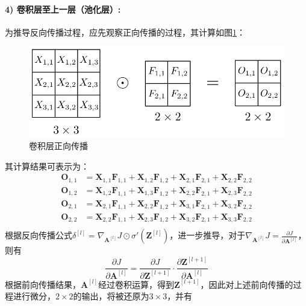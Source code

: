 \paragraph{4) 卷积层至上一层（池化层）:}
为推导反向传播过程，应先观察正向传播的过程，其计算如图\ref{fig:conv-fp}：
\begin{figure}[htbp]
  \centering
  \includegraphics[width=.8\textwidth]{figures/convolutional-fp.pdf}
  \caption{卷积层正向传播}
  \label{fig:conv-fp}
\end{figure}
其计算结果可表示为：
$$
\begin{aligned}
  \mathbf{O}_{1,1} &= \mathbf{X}_{1,1}\mathbf{F}_{1,1} + \mathbf{X}_{1,2}\mathbf{F}_{1,2} + \mathbf{X}_{2,1}\mathbf{F}_{2,1} + \mathbf{X}_{2,2}\mathbf{F}_{2,2} \\
  \mathbf{O}_{1,2} &= \mathbf{X}_{1,2}\mathbf{F}_{1,1} + \mathbf{X}_{1,3}\mathbf{F}_{1,2} + \mathbf{X}_{2,2}\mathbf{F}_{2,1} + \mathbf{X}_{2,3}\mathbf{F}_{2,2} \\
  \mathbf{O}_{2,1} &= \mathbf{X}_{2,1}\mathbf{F}_{1,1} + \mathbf{X}_{2,2}\mathbf{F}_{1,2} + \mathbf{X}_{3,1}\mathbf{F}_{2,1} + \mathbf{X}_{3,2}\mathbf{F}_{2,2} \\
  \mathbf{O}_{2,2} &= \mathbf{X}_{2,2}\mathbf{F}_{1,1} + \mathbf{X}_{2,3}\mathbf{F}_{1,2} + \mathbf{X}_{3,2}\mathbf{F}_{2,1} + \mathbf{X}_{3,3}\mathbf{F}_{2,2} \\
\end{aligned}
$$
根据反向传播公式$\delta ^{[l]} = \nabla _{\mathbf{A}^{[l]}} J \odot \sigma' \left(\mathbf{Z}^{[l]}\right)$，进一步推导，对于$\nabla _{\mathbf{A}^{[l]}} J = \frac{\partial J}{\partial \mathbf{A}^{[l]}}$，则有
$$
\frac{\partial J}{\partial \mathbf{A}^{[l]}} = \frac{\partial J}{\partial \mathbf{Z}^{[l + 1]}} \cdot \frac{\partial \mathbf{Z}^{[l + 1]}}{\partial \mathbf{A}^{[l]}}
$$
根据前向传播结果，$\mathbf{A}^{[l]}$经过卷积运算，得到$\mathbf{Z}^{[l + 1]}$，因此对上述前向传播的过程进行微分，$2\times 2$的输出，将被还原为$3 \times 3$，并有
